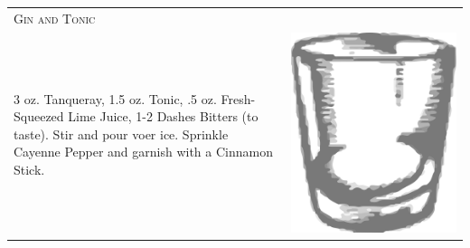 \documentclass{article}
\begin{document}
\begin{tabular}{p{2in} p{0.5in}}
	  \multicolumn{2}{p{3in}}{\centering\Huge\textsc{Gin and Tonic}} \\ 
	   \vspace{-0.1in}3 oz. Tanqueray, 1.5 oz. Tonic, .5 oz. Fresh-Squeezed Lime Juice, 1-2  Dashes Bitters (to taste). Stir and pour voer ice. Sprinkle Cayenne Pepper and garnish with a Cinnamon Stick. &
	   \vspace{-0.1in} \includegraphics{rocks_glass.png}
\end{tabular}
\end{document}
